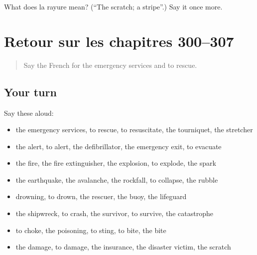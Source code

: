 \begin{tcolorbox}[breakable,colback=teal!4,colframe=teal!35!black,title={Before you move on}]
What does la rayure mean? (\textquotedblleft{}The scratch; a stripe\textquotedblright{}.) Say it once more.
\end{tcolorbox}
\section[(dialogue)]{Retour sur les chapitres 300–307}

\label{lesson:FR-R307-revision-300-307}



\begin{quote}
Say the French for the emergency services and to rescue.
\end{quote}

\subsection*{Your turn}
Say these aloud:

\begin{itemize}
\raggedright
  \item the emergency services, to rescue, to resuscitate, the tourniquet, the stretcher
  \item the alert, to alert, the defibrillator, the emergency exit, to evacuate
  \item the fire, the fire extinguisher, the explosion, to explode, the spark
  \item the earthquake, the avalanche, the rockfall, to collapse, the rubble
  \item drowning, to drown, the rescuer, the buoy, the lifeguard
  \item the shipwreck, to crash, the survivor, to survive, the catastrophe
  \item to choke, the poisoning, to sting, to bite, the bite
  \item the damage, to damage, the insurance, the disaster victim, the scratch
\end{itemize}

